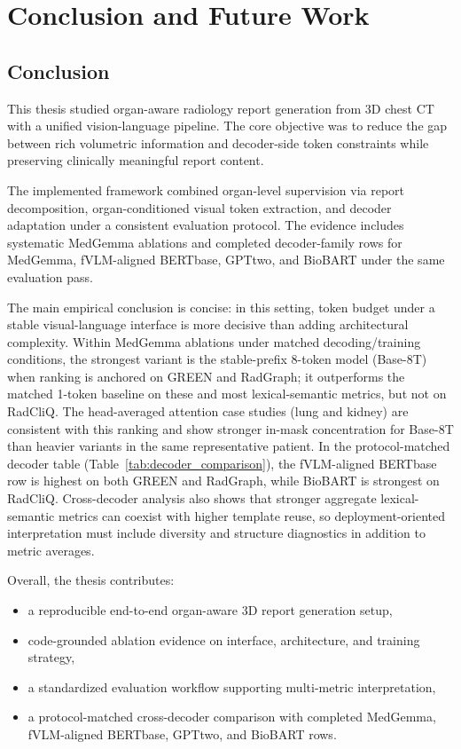 \chapter{Conclusion and Future Work}\label{chapter:conclusion}

\section{Conclusion}
This thesis studied organ-aware radiology report generation from 3D chest CT with a unified vision-language pipeline. The core objective was to reduce the gap between rich volumetric information and decoder-side token constraints while preserving clinically meaningful report content.

The implemented framework combined organ-level supervision via report decomposition, organ-conditioned visual token extraction, and decoder adaptation under a consistent evaluation protocol. The evidence includes systematic MedGemma ablations and completed decoder-family rows for MedGemma, fVLM-aligned \ac{BERTbase}, \ac{GPTtwo}, and BioBART under the same evaluation pass.

The main empirical conclusion is concise: in this setting, token budget under a stable visual-language interface is more decisive than adding architectural complexity. Within MedGemma ablations under matched decoding/training conditions, the strongest variant is the stable-prefix 8-token model (Base-8T) when ranking is anchored on \ac{GREEN} and \ac{RadGraph}; it outperforms the matched 1-token baseline on these and most lexical-semantic metrics, but not on \ac{RadCliQ}. The head-averaged attention case studies (lung and kidney) are consistent with this ranking and show stronger in-mask concentration for Base-8T than heavier variants in the same representative patient. In the protocol-matched decoder table (Table~\ref{tab:decoder_comparison}), the fVLM-aligned \ac{BERTbase} row is highest on both \ac{GREEN} and \ac{RadGraph}, while BioBART is strongest on \ac{RadCliQ}. Cross-decoder analysis also shows that stronger aggregate lexical-semantic metrics can coexist with higher template reuse, so deployment-oriented interpretation must include diversity and structure diagnostics in addition to metric averages.

Overall, the thesis contributes:
\begin{itemize}
    \item a reproducible end-to-end organ-aware 3D report generation setup,
    \item code-grounded ablation evidence on interface, architecture, and training strategy,
    \item a standardized evaluation workflow supporting multi-metric interpretation,
    \item a protocol-matched cross-decoder comparison with completed MedGemma, fVLM-aligned \ac{BERTbase}, \ac{GPTtwo}, and BioBART rows.
\end{itemize}

